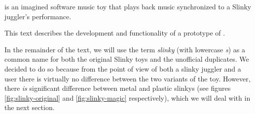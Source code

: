 \slinkyconductor{} is an imagined software music toy that
plays back music synchronized to a Slinky juggler's performance.

This text describes the development and functionality of
a prototype of \slinkyconductor{}.

In the remainder of the text, we will use the term \emph{slinky}
(with lowercase \emph{s}) as a common name for both
the original Slinky toys and
the unofficial duplicates.
We decided to do so because from the point of view of both
a slinky juggler and
a \slinkyconductor{} user
there is virtually no difference between the two variants of the toy.
However, there \emph{is} significant difference between
metal and plastic slinkys
(see figures \ref{fig:slinky-original} and \ref{fig:slinky-magic}
respectively),
which we will deal with in the next section.
